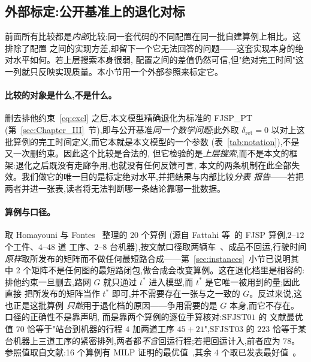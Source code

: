 \documentclass[manuscript,screen,review]{acmart}
\newcommand{\PubNInst}{20}
\newcommand{\PubNOpt}{16}                 %
\newcommand{\PubNLayoutBad}{2}            %
\begin{document}

\subsection{外部标定:公开基准上的退化对标}
\label{sec:external}

前面所有比较都是\emph{内部}比较:同一套代码的不同配置在同一批自建算例上相比。这排除了配置
之间的实现方差,却留下一个它无法回答的问题——这套实现本身的绝对水平如何。若上层搜索本身很弱,
配置之间的差值仍然可信,但"绝对完工时间"这一列就只反映实现质量。本小节用一个外部参照来标定它。

\paragraph{比较的对象是什么,不是什么。}
删去排他约束~\eqref{eq:excl} 之后,本文模型精确退化为标准的 FJSP\_PT
(第~\ref{sec:Chapter_III}~节),即与公开基准\emph{同一个数学问题};此外取
$\delta_{\mathrm{ret}}=0$ 以对上这批算例的完工时间定义,而它本就是本文模型的一个参数
(表~\ref{tab:notation}),不是又一次删约束。因此这个比较是合法的,
但它检验的是\emph{上层搜索},而不是本文的框架:退化之后既没有走廊争用,也就没有任何反馈可言,
本文的两条机制在此全部失效。我们做它的唯一目的是标定绝对水平,并把结果与内部比较\emph{分表
报告}——若把两者并进一张表,读者将无法判断哪一条结论靠哪一批数据。

\paragraph{算例与口径。}
取 Homayouni 与 Fontes~\cite{homayouni2021production} 整理的 \PubNInst{} 个算例
(源自 Fattahi 等~\cite{fattahi2007mathematical}的 FJSP 算例,$2$--$12$ 个工件、$4$--$48$ 道
工序、$2$--$8$ 台机器),按文献口径取两辆车~\cite{lim2023twophase}、成品不回运,行驶时间
\emph{原样}取所发布的矩阵而不做任何最短路合成——第~\ref{sec:instances}~小节已说明其中
\PubNLayoutBad{} 个矩阵不是任何图的最短路闭包,做合成会改变算例。这在退化档里是相容的:
排他约束一旦删去,路网 $G$ 就只通过 $t^{*}$ 进入模型,而 $t^{*}$ 是它唯一被用到的量;因此直接
把所发布的矩阵当作 $t^{*}$ 即可,并不需要存在一张与之一致的 $G$。反过来说,这也正是这批算例
\emph{只能}用于退化档的原因——争用需要的是 $G$ 本身,而它不存在。口径的正确性不是靠声明,
而是靠两个算例的逐位手算核对:$\mathrm{SFJST}01$ 的
文献最优值 $70$ 恰等于"站台到机器的行程 $4$ 加两道工序 $45+21$",$\mathrm{SFJST}03$ 的 $223$
恰等于某台机器上三道工序的紧密排列,两者都\emph{不含}回运行程;若把回运计入,前者应为 $78$。
参照值取自文献:\PubNOpt{} 个算例有 MILP 证明的最优值~\cite{homayouni2021production},其余
$4$ 个取已发表最好值~\cite{lim2023twophase}。
\end{document}
